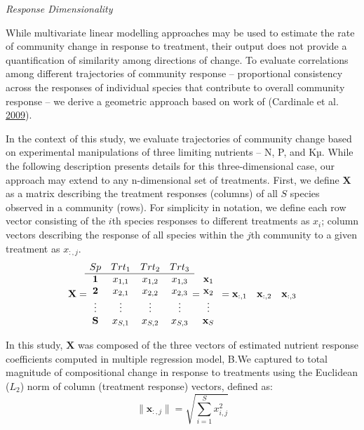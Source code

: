 \documentclass[twoside,12pt,final]{ucthesis-CA2012}
\begin{document}
\begin{ucmainmatter}
\emph{Response Dimensionality}

While multivariate linear modelling approaches may be used to estimate the rate of community change in response to treatment, their output does not provide a quantification of similarity among directions of change. To evaluate correlations among different trajectories of community response -- proportional consistency across the responses of individual species that contribute to overall community response -- we derive a geometric approach based on work of (Cardinale et al. \protect\hyperlink{ref-Cardinale2009}{2009}).

In the context of this study, we evaluate trajectories of community change based on experimental manipulations of three limiting nutrients -- N, P, and Kµ. While the following description presents details for this three-dimensional case, our approach may extend to any n-dimensional set of treatments. First, we define \(\mathbf{X}\) as a matrix describing the treatment responses (columns) of all \(S\) species observed in a community (rows). For simplicity in notation, we define each row vector consisting of the \(i\)th species responses to different treatments as \(x_i\); column vectors describing the response of all species within the \(j\)th community to a given treatment as \(x_{:,j}\).
\[
\mathbf{X} = 
\begin{matrix}
Sp & Trt_1 & Trt_2 & Trt_3\\
\hline
\mathbf{1}& x_{1,1} & x_{1,2} & x_{1,3} \\
\mathbf{2} & x_{2,1} & x_{2,2} & x_{2,3} \\
\vdots & \vdots & \vdots & \vdots \\
\mathbf{S} & x_{S,1} & x_{S,2} & x_{S,3} \\
\end{matrix} =
\begin{matrix}
\\
\mathbf{x}_1 \\
\mathbf{x}_2 \\
\vdots \\
\mathbf{x}_S \\
\end{matrix} \\
= \\
\begin{matrix}
\mathbf{x}_{:,1} & \mathbf{x}_{:,2} & \mathbf{x}_{:,3}\\
\end{matrix}
\]

In this study, \(\mathbf{X}\) was composed of the three vectors of estimated nutrient response coefficients computed in multiple regression model, B.We captured to total magnitude of compositional change in response to treatments using the Euclidean (\(L_2\)) norm of column (treatment response) vectors, defined as:
\[\|\mathbf{x}_{:,j}\| = \sqrt{\sum_{i = 1}^{S} x_{i,j}^2}\]


\end{ucmainmatter}
\end{document}
